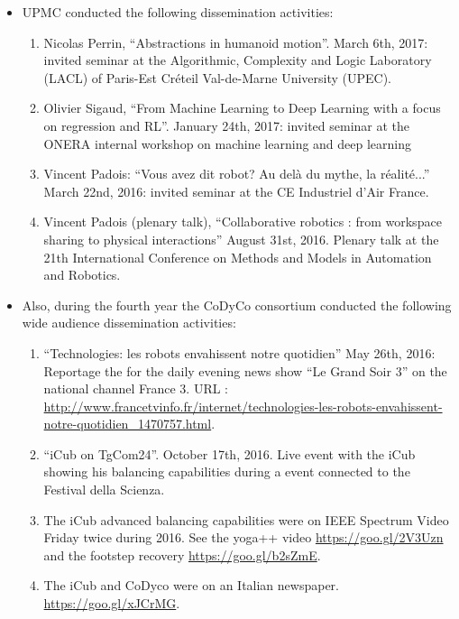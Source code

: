 \begin{itemize}
 \item UPMC conducted the following dissemination activities:
 
 \begin{enumerate}
 \item Nicolas Perrin, ``Abstractions in humanoid motion''. March 6th, 2017: invited seminar at the Algorithmic, Complexity and Logic Laboratory (LACL) of Paris-Est Créteil Val-de-Marne University (UPEC).

 \item Olivier Sigaud, ``From Machine Learning to Deep Learning with a focus on regression and RL''.
 January 24th, 2017: invited seminar at the ONERA internal workshop on machine learning and deep learning

 \item Vincent Padois: ``Vous avez dit robot? Au del\`a du mythe, la r\'ealit\'e...''
 March 22nd, 2016: invited seminar at the CE Industriel d’Air France.
 
 \item Vincent Padois (plenary talk), ``Collaborative robotics : from workspace sharing to physical interactions''
 August 31st, 2016. Plenary talk at the 21th International Conference on Methods and Models in Automation and Robotics.
 
 \end{enumerate}
  
 \item Also, during the fourth year the CoDyCo consortium conducted the following 
 wide audience dissemination activities:
 
 \begin{enumerate}
 \item ``Technologies: les robots envahissent notre quotidien''
 May 26th, 2016: Reportage the for the daily evening news show ``Le Grand Soir 3'' on the national channel France 3. URL : \url{http://www.francetvinfo.fr/internet/technologies-les-robots-envahissent-notre-quotidien_1470757.html}.
 
 \item ``iCub on TgCom24''. October 17th, 2016. Live event with the iCub showing his balancing capabilities during
 a event connected to the Festival della Scienza.
 
 \item The iCub advanced balancing capabilities were on IEEE Spectrum Video Friday twice during 2016. 
 See the yoga++ video  
\url{https://goo.gl/2V3Uzn} and the footstep recovery  \url{https://goo.gl/b2sZmE}.

\item The iCub and CoDyco were on an Italian newspaper. \url{https://goo.gl/xJCrMG}.

 \end{enumerate}
 
\end{itemize}
